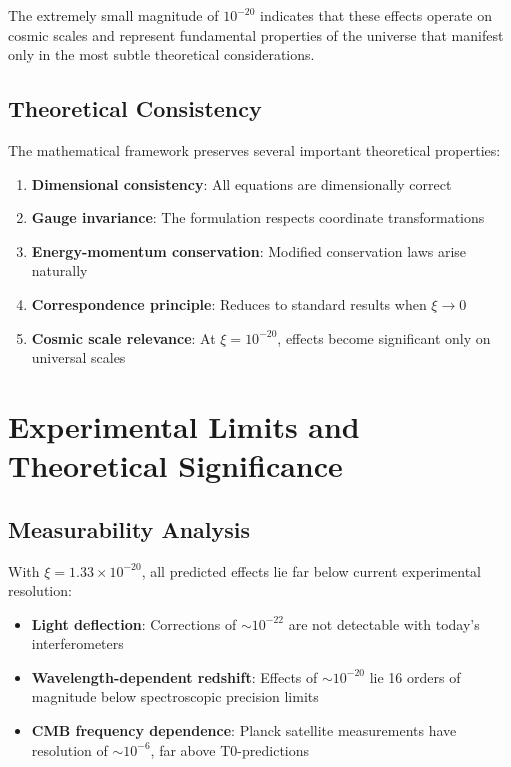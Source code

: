 \documentclass[12pt,a4paper]{article}
\theoremstyle{definition}
\begin{document}
	The extremely small magnitude of $10^{-20}$ indicates that these effects operate on cosmic scales and represent fundamental properties of the universe that manifest only in the most subtle theoretical considerations.
	
	\subsection{Theoretical Consistency}
	
	The mathematical framework preserves several important theoretical properties:
	
	\begin{enumerate}
		\item \textbf{Dimensional consistency}: All equations are dimensionally correct
		\item \textbf{Gauge invariance}: The formulation respects coordinate transformations
		\item \textbf{Energy-momentum conservation}: Modified conservation laws arise naturally
		\item \textbf{Correspondence principle}: Reduces to standard results when $\xi \rightarrow 0$
		\item \textbf{Cosmic scale relevance}: At $\xi = 10^{-20}$, effects become significant only on universal scales
	\end{enumerate}
	
	\section{Experimental Limits and Theoretical Significance}
	
	\subsection{Measurability Analysis}
	
	With $\xi = 1.33 \times 10^{-20}$, all predicted effects lie far below current experimental resolution:
	
	\begin{itemize}
		\item \textbf{Light deflection}: Corrections of $\sim 10^{-22}$ are not detectable with today's interferometers
		\item \textbf{Wavelength-dependent redshift}: Effects of $\sim 10^{-20}$ lie 16 orders of magnitude below spectroscopic precision limits
		\item \textbf{CMB frequency dependence}: Planck satellite measurements have resolution of $\sim 10^{-6}$, far above T0-predictions
	\end{itemize}
	
\end{document}
